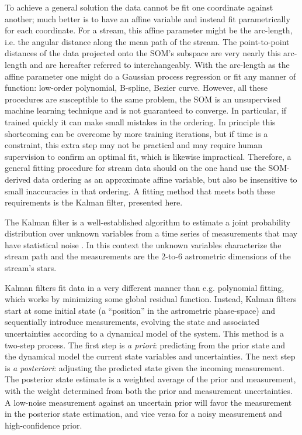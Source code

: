 \documentclass[fleqn,usenatbib]{mnras}
\begin{document}
    To achieve a general solution the data cannot be fit one coordinate against
    another; much better is to have an affine variable and instead fit
    parametrically for each coordinate. For a stream, this affine parameter
    might be the arc-length, i.e. the angular distance along the mean path of
    the stream. The point-to-point distances of the data projected onto the
    SOM's subspace are very nearly this arc-length and are hereafter referred to
    interchangeably. With the arc-length as the affine parameter one might do a
    Gaussian process regression \citep{Cervone2015} or fit any manner of
    function: low-order polynomial, B-spline, Bezier curve. However, all these
    procedures are susceptible to the same problem, the SOM is an unsupervised
    machine learning technique and is not guaranteed to converge. In particular,
    if trained quickly it can make small mistakes in the ordering. In principle
    this shortcoming can be overcome by more training iterations, but if time is
    a constraint, this extra step may not be practical and may require human
    supervision to confirm an optimal fit, which is likewise impractical.
    Therefore, a general fitting procedure for stream data should on the one
    hand use the SOM-derived data ordering as an approximate affine variable,
    but also be insensitive to small inaccuracies in that ordering. A fitting
    method that meets both these requirements is the Kalman filter, presented
    here.



    The Kalman filter is a well-established algorithm to estimate a joint
    probability distribution over unknown variables from a time series of
    measurements that may have statistical noise \citep{Kalman1960}. In this
    context the unknown variables characterize the stream path and the
    measurements are the 2-to-6 astrometric dimensions of the stream's stars.

    Kalman filters fit data in a very different manner than e.g. polynomial
    fitting, which works by minimizing some global residual function. Instead,
    Kalman filters start at some initial state (a ``position'' in the
    astrometric phase-space) and sequentially introduce measurements, evolving
    the state and associated uncertainties according to a dynamical model of the
    system. This method is a two-step process. The first step is \textit{a
    priori}: predicting from the prior state and the dynamical model the current
    state variables and uncertainties. The next step is \textit{a posteriori}:
    adjusting the predicted state given the incoming measurement. The posterior
    state estimate is a weighted average of the prior and measurement, with the
    weight determined from both the prior and measurement uncertainties. A
    low-noise measurement against an uncertain prior will favor the measurement
    in the posterior state estimation, and vice versa for a noisy measurement
    and high-confidence prior.
\end{document}
